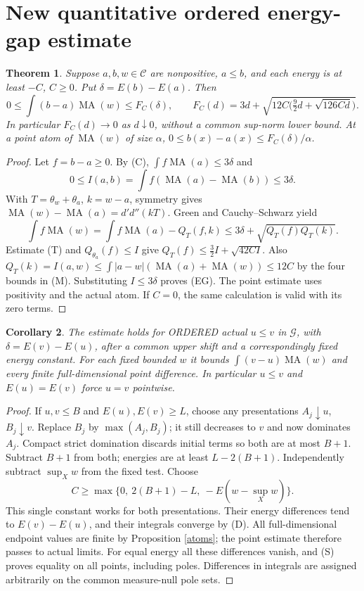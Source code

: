 \documentclass[11pt]{article}
\newcommand{\DD}{d'd''}
\newcommand{\MA}{\operatorname{MA}}
\newcommand{\C}{\mathcal C}
\newcommand{\G}{\mathcal G}
\newtheorem{theorem}{Theorem}
\newtheorem{corollary}[theorem]{Corollary}
\theoremstyle{remark}\newtheorem{remark}[theorem]{Remark}
\begin{document}
\section{New quantitative ordered energy-gap estimate}
\begin{theorem}\label{gap}
Suppose $a,b,w\in\C$ are nonpositive, $a\le b$, and each energy
is at least $-C$, $C\ge0$. Put $\delta=E(b)-E(a)$. Then
\[
0\le\int(b-a)\MA(w)\le F_C(\delta),\qquad
F_C(d)=3d+\sqrt{12C\bigl(\tfrac92d+\sqrt{126Cd}\bigr)}.
\tag{EG}
\]
In particular $F_C(d)\to0$ as $d\downarrow0$, without a common
sup-norm lower bound. At a point atom of $\MA(w)$ of size $\alpha$,
$0\le b(x)-a(x)\le F_C(\delta)/\alpha$.
\end{theorem}
\begin{proof}
Let $f=b-a\ge0$. By (C),
$\int f\MA(a)\le3\delta$ and
\[
0\le I(a,b)=\int f(\MA(a)-\MA(b))\le3\delta.
\]
With $T=\theta_w+\theta_a$, $k=w-a$, symmetry gives
$\MA(w)-\MA(a)=\DD(kT)$. Green and Cauchy--Schwarz yield
\[
\int f\MA(w)=\int f\MA(a)-Q_T(f,k)
\le3\delta+\sqrt{Q_T(f)Q_T(k)}.
\]
Estimate (T) and $Q_{\theta_a}(f)\le I$ give
$Q_T(f)\le\frac32I+\sqrt{42CI}$.
Also $Q_T(k)=I(a,w)\le\int |a-w|(\MA(a)+\MA(w))\le12C$
by the four bounds in (M). Substituting $I\le3\delta$ proves (EG).
The point estimate uses positivity and the actual atom. If $C=0$, the
same calculation is valid with its zero terms.
\end{proof}

\begin{corollary}\label{ggap}
The estimate holds for ORDERED actual $u\le v$ in $\G$, with
$\delta=E(v)-E(u)$, after a common upper shift and a correspondingly
fixed energy constant. For each fixed bounded $w$ it bounds
$\int(v-u)\MA(w)$ and every finite full-dimensional point difference.
In particular $u\le v$ and $E(u)=E(v)$ force $u=v$ pointwise.
\end{corollary}
\begin{proof}
If $u,v\le B$ and $E(u),E(v)\ge L$, choose any presentations
$A_j\downarrow u$, $B_j\downarrow v$. Replace $B_j$ by
$\max(A_j,B_j)$; it still decreases to $v$ and now dominates $A_j$.
Compact strict domination discards initial terms so both are at most
$B+1$. Subtract $B+1$ from both; energies are at least
$L-2(B+1)$. Independently subtract $\sup_Xw$ from the fixed test.
Choose
\[
C\ge\max\{0,\ 2(B+1)-L,\ -E(w-\sup_Xw)\}.
\]
This single constant works for both presentations. Their energy
differences tend to $E(v)-E(u)$, and their integrals converge by (D).
All full-dimensional endpoint values are finite by Proposition
\ref{atoms}; the point estimate therefore passes to actual limits.
For equal energy all these differences vanish, and (S) proves equality
on all points, including poles. Differences in integrals are assigned
arbitrarily on the common measure-null pole sets.
\end{proof}
\end{document}
